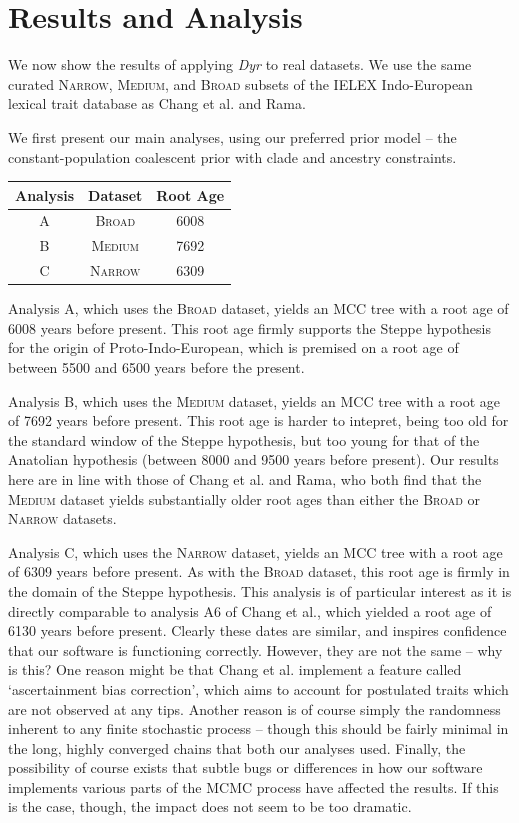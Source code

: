 \documentclass[10pt,journal,compsoc]{IEEEtran}
\begin{document}
\section{Results and Analysis}

We now show the results of applying \textit{Dyr} to real datasets. We use the same curated \textsc{Narrow}, \textsc{Medium}, and \textsc{Broad} subsets of the IELEX Indo-European lexical trait database as Chang et al. and Rama.

We first present our main analyses, using our preferred prior model -- the constant-population coalescent prior with clade and ancestry constraints.

\begin{center}
    \begin{tabular}{ |c|c|c| }
    \hline
    Analysis&Dataset&Root Age\\
    \hline
    A&\textsc{Broad}&6008\\
    B&\textsc{Medium}&7692\\
    C&\textsc{Narrow}&6309\\
    \hline
    \end{tabular}
\end{center}

Analysis A, which uses the \textsc{Broad} dataset, yields an MCC tree with a root age of 6008 years before present. This root age firmly supports the Steppe hypothesis for the origin of Proto-Indo-European, which is premised on a root age of between 5500 and 6500 years before the present.

Analysis B, which uses the \textsc{Medium} dataset, yields an MCC tree with a root age of 7692 years before present. This root age is harder to intepret, being too old for the standard window of the Steppe hypothesis, but too young for that of the Anatolian hypothesis (between 8000 and 9500 years before present). Our results here are in line with those of Chang et al. and Rama, who both find that the \textsc{Medium} dataset yields substantially older root ages than either the \textsc{Broad} or \textsc{Narrow} datasets.

Analysis C, which uses the \textsc{Narrow} dataset, yields an MCC tree with a root age of 6309 years before present. As with the \textsc{Broad} dataset, this root age is firmly in the domain of the Steppe hypothesis. This analysis is of particular interest as it is directly comparable to analysis A6 of Chang et al., which yielded a root age of 6130 years before present. Clearly these dates are similar, and inspires confidence that our software is functioning correctly. However, they are not the same -- why is this? One reason might be that Chang et al. implement a feature called `ascertainment bias correction', which aims to account for postulated traits which are not observed at any tips. Another reason is of course simply the randomness inherent to any finite stochastic process -- though this should be fairly minimal in the long, highly converged chains that both our analyses used. Finally, the possibility of course exists that subtle bugs or differences in how our software implements various parts of the MCMC process have affected the results. If this is the case, though, the impact does not seem to be too dramatic.
\end{document}
